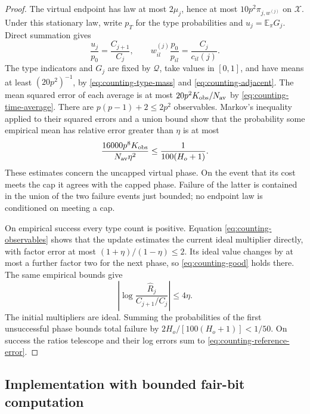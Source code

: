 \begin{proof}
The virtual endpoint has law at most $2\mu_j$, hence at most
$10p^2\pi_{j,w^{(j)}}$ on $\mathcal X$.  Under this stationary law,
write $p_T$ for the type probabilities and $u_j=\mathbb E_\pi G_j$.
Direct summation gives
\begin{equation}
 \frac{u_j}{p_0}=\frac{C_{j+1}}{C_j},\qquad
 w_{il}^{(j)}\frac{p_0}{p_{il}}=\frac{C_j}{c_{il}(j)}.
 \label{eq:counting-observables}
\end{equation}
The type indicators and $G_j$ are fixed by $\mathcal Q$, take values
in $[0,1]$, and have means at least $(20p^2)^{-1}$, by
\eqref{eq:counting-type-mass} and \eqref{eq:counting-adjacent}.
The mean squared error of each average is at most
$20p^2K_{\rm obs}/N_{\rm av}$ by
\eqref{eq:counting-time-average}.  There are
$p(p-1)+2\leq2p^2$ observables.  Markov's inequality applied to
their squared errors and a union bound show that the probability
some empirical mean has relative error greater than $\eta$ is at most
\begin{equation}
 \frac{16000p^8K_{\rm obs}}{N_{\rm av}\eta^2}
       \leq\frac1{100(H_o+1)}.
 \label{eq:counting-observation-error}
\end{equation}
These estimates concern the uncapped virtual phase.  On the event
that its cost meets the cap it agrees with the capped phase.
Failure of the latter is contained in the union of the two failure
events just bounded; no endpoint law is conditioned on meeting a cap.

On empirical success every type count is positive.  Equation
\eqref{eq:counting-observables} shows that the update estimates the
current ideal multiplier directly, with factor error at most
$(1+\eta)/(1-\eta)\leq2$.  Its ideal value changes by at most a
further factor two for the next phase, so
\eqref{eq:counting-good} holds there.  The same empirical bounds give
\[
 \left|\log\frac{\widehat R_j}{C_{j+1}/C_j}\right|\leq4\eta.
\]
The initial multipliers are ideal.  Summing the probabilities of the
first unsuccessful phase bounds total failure by
$2H_o/[100(H_o+1)]<1/50$.  On success the ratios telescope and
their log errors sum to \eqref{eq:counting-reference-error}.
\end{proof}

\subsection{Implementation with bounded fair-bit computation}

